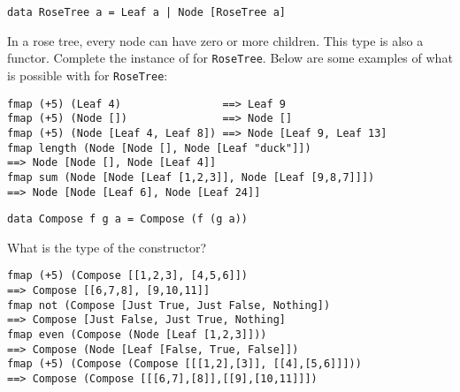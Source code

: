 \taskLine \pagebreak

\begin{verbatim}
data RoseTree a = Leaf a | Node [RoseTree a]
\end{verbatim}
In a rose tree, every node can have zero or more children. This type is also a functor. Complete the instance of  for \texttt{\small RoseTree}. Below are some examples of what is possible with  for \texttt{\small RoseTree}:

\begin{verbatim}
fmap (+5) (Leaf 4)                ==> Leaf 9 
fmap (+5) (Node [])               ==> Node []
fmap (+5) (Node [Leaf 4, Leaf 8]) ==> Node [Leaf 9, Leaf 13]
fmap length (Node [Node [], Node [Leaf "duck"]])
==> Node [Node [], Node [Leaf 4]]
fmap sum (Node [Node [Leaf [1,2,3]], Node [Leaf [9,8,7]]])
==> Node [Node [Leaf 6], Node [Leaf 24]]
\end{verbatim}

\taskLine 

\begin{verbatim}
data Compose f g a = Compose (f (g a))
\end{verbatim}
What is the type of the  constructor?

\begin{verbatim}
fmap (+5) (Compose [[1,2,3], [4,5,6]]) 
==> Compose [[6,7,8], [9,10,11]]
fmap not (Compose [Just True, Just False, Nothing])
==> Compose [Just False, Just True, Nothing]
fmap even (Compose (Node [Leaf [1,2,3]]))
==> Compose (Node [Leaf [False, True, False]])
fmap (+5) (Compose (Compose [[[1,2],[3]], [[4],[5,6]]]))
==> Compose (Compose [[[6,7],[8]],[[9],[10,11]]])
\end{verbatim}


